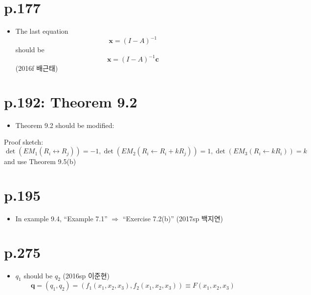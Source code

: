 \documentclass[a4paper]{article}
\begin{document}
\section{p.177} %
\label{sec:p_177}
\begin{itemize}
	\item The last equation
	\[
		\mathbf{x}=(I-A)^{-1}
	\]
	should be
	\[
		\mathbf{x}=(I-A)^{-1}\mathbf{c}
	\]
	(2016f 배근태)
\end{itemize}

\section{p.192: Theorem 9.2} %
\label{sec:p_192_theorem_9_2}
\begin{itemize}
	\item Theorem 9.2 should be modified:
	
\end{itemize}

Proof sketch:
$\det(EM_1(R_i\leftrightarrow R_j))=-1, \det(EM_2(R_i\leftarrow R_i + kR_j))=1, \det(EM_3(R_i\leftarrow k R_i))=k$ and use Theorem 9.5(b)


\section{p.195} %
\label{sec:p_195}
\begin{itemize}
	\item In example 9.4, ``Example 7.1'' $\Rightarrow$ ``Exercise 7.2(b)'' (2017sp 백지연)
\end{itemize}

\section{p.275} %
\label{sec:p_275}
\begin{itemize}
	\item $q_1$ should be $q_2$ (2016sp 이준현)
	\[
		\mathbf{q}=(q_1,q_2)=\left(f_1(x_1,x_2,x_3),f_2(x_1,x_2,x_3)\right)\equiv F(x_1,x_2,x_3)
	\]
\end{itemize}
\end{document}
